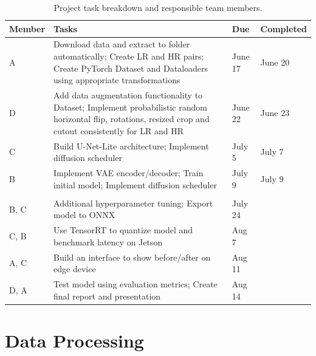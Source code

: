 \documentclass{article} %
\begin{document}
\begin{table}[h!]
\captionsetup{justification=centering}
\caption{Project task breakdown and responsible team members.}
\label{task-table}
\centering
\renewcommand{\arraystretch}{1.5} 
\setlength{\tabcolsep}{6pt}
\begin{tabularx}{\textwidth}{
  >{\centering\arraybackslash}p{1.2cm}   %
  >{\raggedright\arraybackslash}X         %
  >{\centering\arraybackslash}p{1.8cm}   %
  >{\centering\arraybackslash}p{1.8cm}   %
}
\toprule
\textbf{Member} & \textbf{Tasks} & \textbf{Due} & \textbf{Completed} \\
\midrule
A & Download data and extract to folder automatically; Create LR and HR pairs; Create PyTorch Dataset and Dataloaders using appropriate transformations & June 17 & June 20 \\[8pt]

D & Add data augmentation functionality to Dataset; Implement probabilistic random horizontal flip, rotations, resized crop and cutout consistently for LR and HR & June 22 & June 23 \\[8pt]

C & Build U-Net-Lite architecture; Implement diffusion scheduler & July 5 & July 7 \\[8pt]

B & Implement VAE encoder/decoder; Train initial model; Implement diffusion scheduler & July 9 & July 9 \\[12pt]

\multicolumn{4}{l}{\textbf{Upcoming Tasks}} \\
\addlinespace[8pt]

B, C & Additional hyperparameter tuning; Export model to ONNX & July 24 & \\[8pt]

C, B & Use TensorRT to quantize model and benchmark latency on Jetson & Aug 7 & \\[8pt]

A, C & Build an interface to show before/after on edge device & Aug 11 & \\[8pt]

D, A & Test model using evaluation metrics; Create final report and presentation & Aug 14 & \\
\bottomrule
\end{tabularx}
\end{table}


\section{Data Processing}
\end{document}
